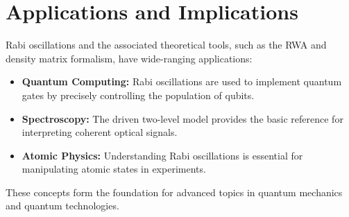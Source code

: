 
\section{Applications and Implications}

Rabi oscillations and the associated theoretical tools, such as the RWA and density matrix formalism, have wide-ranging applications:
\begin{itemize}
	\item \textbf{Quantum Computing:} Rabi oscillations are used to implement quantum gates by precisely controlling the population of qubits.
	\item \textbf{Spectroscopy:} The driven two-level model provides the basic reference for interpreting coherent optical signals.
	\item \textbf{Atomic Physics:} Understanding Rabi oscillations is essential for manipulating atomic states in experiments.
\end{itemize}
These concepts form the foundation for advanced topics in quantum mechanics and quantum technologies.
